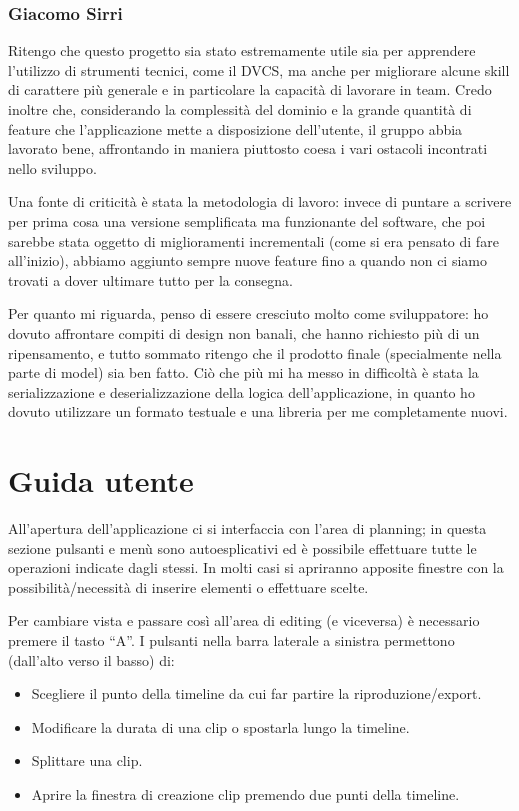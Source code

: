 \documentclass[a4paper,12pt]{report}
\begin{document}
\subsection{Giacomo Sirri}
Ritengo che questo progetto sia stato estremamente utile sia per apprendere l’utilizzo di strumenti tecnici, come il DVCS, ma anche per migliorare alcune skill di carattere più generale e in particolare la capacità di lavorare in team. Credo inoltre che, considerando la complessità del dominio e la grande quantità di feature che l’applicazione mette a disposizione dell’utente, il gruppo abbia lavorato bene, affrontando in maniera piuttosto coesa i vari ostacoli incontrati nello sviluppo. 

Una fonte di criticità è stata la metodologia di lavoro: invece di puntare a scrivere per prima cosa una versione semplificata ma funzionante del software, che poi sarebbe stata oggetto di miglioramenti incrementali (come si era pensato di fare all’inizio), abbiamo aggiunto sempre nuove feature fino a quando non ci siamo trovati a dover ultimare tutto per la consegna.

Per quanto mi riguarda, penso di essere cresciuto molto come sviluppatore: ho dovuto affrontare compiti di design non banali, che hanno richiesto più di un ripensamento, e tutto sommato ritengo che il prodotto finale (specialmente nella parte di model) sia ben fatto. Ciò che più mi ha messo in difficoltà è stata la serializzazione e deserializzazione della logica dell’applicazione, in quanto ho dovuto utilizzare un formato testuale e una libreria per me completamente nuovi. 

\appendix
\chapter{Guida utente}
All’apertura dell’applicazione ci si interfaccia con l'area di planning; in questa sezione pulsanti e menù sono autoesplicativi ed è possibile effettuare tutte le operazioni indicate dagli stessi. In molti casi si apriranno apposite finestre con la possibilità/necessità di inserire elementi o effettuare scelte. 

Per cambiare vista e passare così all’area di editing (e viceversa) è necessario premere il tasto “A”. I pulsanti nella barra laterale a sinistra permettono (dall'alto verso il basso) di:
\begin{itemize}
    \item Scegliere il punto della timeline da cui far partire la riproduzione/export.
    \item Modificare la durata di una clip o spostarla lungo la timeline.
    \item Splittare una clip.
    \item Aprire la finestra di creazione clip premendo due punti della timeline.
\end{itemize}
\end{document}
